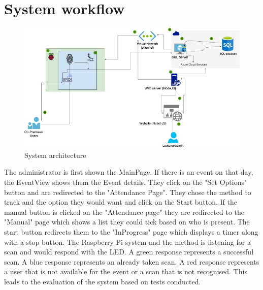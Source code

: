  
 
 
\section{System workflow}
 
\begin{figure}[ht]
\includegraphics[scale=0.56]{Design & Implementation/images/system architecture.jpg}
\caption{System architecture}
\end{figure}
 
The administrator is first shown the MainPage. If there is an event on that day, the EventView shows them the Event details. They click on  the "Set Options" button and are redirected to the "Attendance Page". They chose the method to track and the option they would want and click on the Start button. If the manual button is clicked on the "Attendance page" they are redirected to the "Manual" page which shows a list they could tick based on who is present. The start button redirects them to the "InProgress" page which displays a timer along with a stop button. The Raspberry Pi system and the method is listening for a scan and would respond with the LED. A green response represents a successful scan. A blue response represents an already taken scan. A red response represents a user that is not available for the event or a scan that is not recognised. This leads to the evaluation of the system based on tests conducted.
